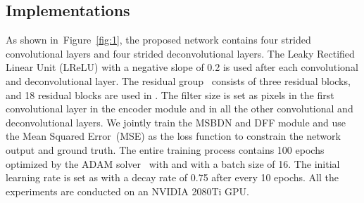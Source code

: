 \documentclass[10pt,twocolumn,letterpaper]{article}
\newcommand{\figref}[1]{Figure~\ref{fig:#1}}
\begin{document}
  \vspace{-1mm}
  \subsection{Implementations}
  \label{sec:3.3}
  \vspace{-1mm}
  As shown in~\figref{1}, the proposed network contains four strided convolutional layers and four strided deconvolutional layers.
The Leaky Rectified Linear Unit (LReLU) with a negative slope of 0.2 is used after each convolutional and deconvolutional layer.
The residual group~\cite{EDSR} consists of three residual blocks, and 18 residual blocks are used in .
The filter size is set as  pixels in the first convolutional layer in the encoder module
  and  in all the other convolutional and deconvolutional layers.
We jointly train the MSBDN and DFF module and use the Mean Squared Error~(MSE) as the loss function to constrain the network output and ground truth.
The entire training process contains 100 epochs optimized by the ADAM solver~\cite{adam} with  and  with a batch size of 16.
The initial learning rate is set as  with a decay rate of 0.75 after every 10 epochs.
All the experiments are conducted on an NVIDIA 2080Ti GPU.
\end{document}
